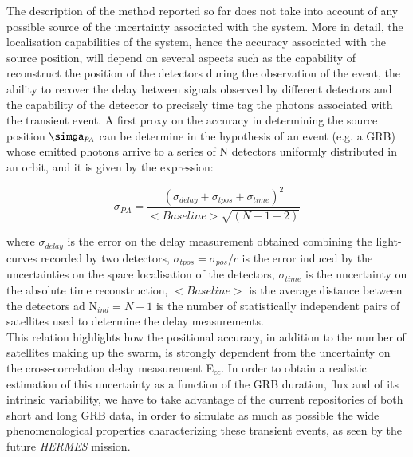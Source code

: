 \documentclass[]{spie}  %
\def \her{\textit{HERMES}\xspace}
\begin{document}
The description of the method reported so far does not take into account of any possible source of the uncertainty associated with the system. More in detail, the localisation capabilities of the system, hence the accuracy associated with the source position, will depend on several aspects such as the capability of reconstruct the position of the detectors during the observation of the event, the ability to recover the delay between signals observed by different detectors and the capability of the detector to precisely time tag the photons associated with the transient event. 
A first proxy on the accuracy in determining the source position $\simga_{PA}$ can be determine in the hypothesis of an event (e.g. a GRB) whose emitted photons arrive to a series of N detectors uniformly distributed in an orbit, and it is given by the expression:

\begin{equation}
\label{eq:sigma_pos}
\sigma_{PA} = \dfrac{(\sigma_{delay}+\sigma_{tpos}+\sigma_{time})^2}{<Baseline>\sqrt{(N-1-2)}}
\end{equation}

where $\sigma_{delay}$ is the error on the delay measurement obtained combining the light-curves recorded by two detectors, $\sigma_{tpos}=\sigma_{pos}/c$ is the error induced by the uncertainties on the space localisation of the detectors, $\sigma_{time}$ is the uncertainty on the absolute time reconstruction, $<Baseline>$ is the average distance between the detectors ad N$_{ind} = N-1$ is the number of statistically independent pairs of satellites used to determine the delay measurements.\\
This relation highlights how the positional accuracy, in addition to the number of satellites making up the swarm, is strongly dependent from the uncertainty on the cross-correlation delay measurement E$_{cc}$. In order to obtain a realistic estimation of this uncertainty as a function of the GRB duration, flux and of its intrinsic variability, we have to take advantage of the current repositories of both short and long GRB data, in order to simulate as much as possible the wide phenomenological properties characterizing these transient events, as seen by the future \her mission. 
\end{document}
